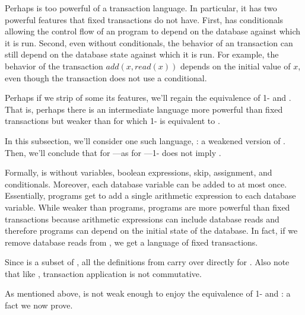 Perhaps \imp{} is too powerful of a transaction language. In particular, it has
two powerful features that fixed transactions do not have. First, \imp{} has
conditionals allowing the control flow of an \imp{} program to depend on the
database against which it is run. Second, even without conditionals, the
behavior of an \imp{} transaction can still depend on the database state
against which it is run. For example, the behavior of the transaction $add(x,
read(x))$ depends on the initial value of $x$, even though the transaction does
not use a conditional.

Perhaps if we strip \imp{} of some its features, we'll regain the equivalence
of 1-\iconfluence{} and \iconfluence{}. That is, perhaps there is an
intermediate language more powerful than fixed transactions but weaker than
\imp{} for which 1-\iconfluence{} is equivalent to \iconfluence{}.

In this subsection, we'll consider one such language, \wimp{}: a weakened
version of \imp{}. Then, we'll conclude that for \wimp{}---as for
\imp{}---1-\iconfluence{} does not imply \iconfluence{}.

Formally, \wimp{} is \imp{} without variables, boolean expressions, skip,
assignment, and conditionals. Moreover, each database variable can be added to
at most once. Essentially, \wimp{} programs get to add a single arithmetic
expression to each database variable. While weaker than \imp{} programs,
\wimp{} programs are more powerful than fixed transactions because arithmetic
expressions can include database reads and therefore \wimp{} programs can
depend on the initial state of the database. In fact, if we remove database
reads from \wimp{}, we get a language of fixed transactions.

Since \wimp{} is a subset of \imp{}, all the definitions from \imp{} carry over
directly for \wimp{}. Also note that like \imp{}, \wimp{} transaction
application is not commutative.

As mentioned above, \wimp{} is not weak enough to enjoy the equivalence of
1-\iconfluence{} and \iconfluence{}: a fact we now prove.


